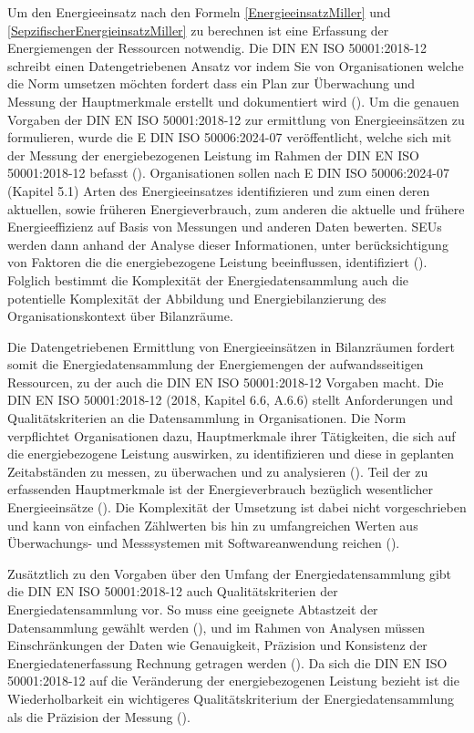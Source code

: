 Um den Energieeinsatz nach den Formeln \eqref{EnergieeinsatzMiller} und \eqref{SepzifischerEnergieinsatzMiller} zu berechnen ist eine Erfassung der Energiemengen 
der Ressourcen notwendig.
Die DIN EN ISO 50001:2018-12 schreibt einen Datengetriebenen Ansatz vor indem Sie von Organisationen welche die Norm umsetzen möchten fordert dass ein Plan zur 
Überwachung und Messung der Hauptmerkmale erstellt und dokumentiert wird (\cite[S. 30ff.]{DIN50001.2018}).
Um die genauen Vorgaben der DIN EN ISO 50001:2018-12 zur ermittlung von Energieeinsätzen zu formulieren, wurde die E DIN ISO 50006:2024-07 veröffentlicht,
welche sich mit der Messung der energiebezogenen Leistung im Rahmen der DIN EN ISO 50001:2018-12 befasst (\cite[S. 1]{DIN50006.2024}).
Organisationen sollen nach E DIN ISO 50006:2024-07 (Kapitel 5.1) Arten des Energieeinsatzes identifizieren und zum einen deren aktuellen, sowie früheren 
Energieverbrauch, zum anderen die aktuelle und frühere Energieeffizienz auf Basis von Messungen und anderen Daten bewerten. 
SEUs werden dann anhand der Analyse dieser Informationen, unter berücksichtigung von Faktoren die die energiebezogene Leistung beeinflussen, 
identifiziert (\cite[Kapitel 5.1]{DIN50006.2024}). 
Folglich bestimmt die Komplexität der Energiedatensammlung auch die potentielle Komplexität der Abbildung und Energiebilanzierung 
des Organisationskontext über Bilanzräume. 

Die Datengetriebenen Ermittlung von Energieeinsätzen in Bilanzräumen fordert somit die Energiedatensammlung der Energiemengen der aufwandsseitigen Ressourcen, 
zu der auch die DIN EN ISO 50001:2018-12 Vorgaben macht.
Die DIN EN ISO 50001:2018-12 (2018, Kapitel 6.6, A.6.6) stellt Anforderungen und Qualitätskriterien an die Datensammlung in Organisationen.
Die Norm verpflichtet Organisationen dazu, Hauptmerkmale ihrer Tätigkeiten, die sich auf die energiebezogene Leistung auswirken, zu identifizieren und diese in geplanten
Zeitabständen zu messen, zu überwachen und zu analysieren (\cite[S. 23]{DIN50001.2018}).
Teil der zu erfassenden Hauptmerkmale ist der Energieverbrauch bezüglich wesentlicher Energieeinsätze (\cite[S. 23]{DIN50001.2018}). 
Die Komplexität der Umsetzung ist dabei nicht vorgeschrieben und kann von einfachen Zählwerten bis hin zu umfangreichen Werten aus Überwachungs- und Messsystemen mit
Softwareanwendung reichen (\cite[S. 36]{DIN50001.2018}).

Zusätztlich zu den Vorgaben über den Umfang der Energiedatensammlung gibt die DIN EN ISO 50001:2018-12 auch Qualitätskriterien der Energiedatensammlung vor.
So muss eine geeignete Abtastzeit der Datensammlung gewählt werden (\cite[S. 20]{DIN50006.2024}), und im Rahmen von Analysen müssen Einschränkungen der Daten 
wie Genauigkeit, Präzision und Konsistenz der Energiedatenerfassung Rechnung getragen werden (\cite[S. 37]{DIN50001.2018}).  
Da sich die DIN EN ISO 50001:2018-12 auf die Veränderung der energiebezogenen Leistung bezieht ist die Wiederholbarkeit ein wichtigeres Qualitätskriterium der 
Energiedatensammlung als die Präzision der Messung (\cite[S. 3]{Szajdzicki.2017}).

